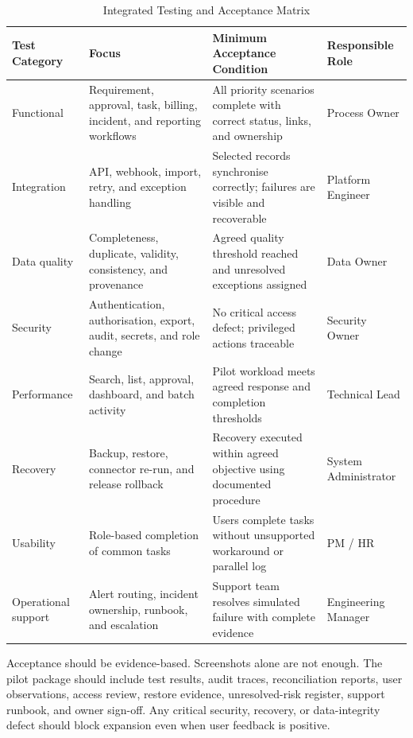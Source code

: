 \documentclass[12pt,a4paper]{report}
\begin{document}
\begin{table}[H]
\centering
\caption{Integrated Testing and Acceptance Matrix}
\label{tab:acceptance-matrix}
\scriptsize
\renewcommand{\arraystretch}{1.14}
\begin{tabularx}{\textwidth}{>{\raggedright\arraybackslash}p{2.3cm}
                                >{\raggedright\arraybackslash}p{3.3cm}
                                >{\raggedright\arraybackslash}X
                                >{\raggedright\arraybackslash}p{2.7cm}}
\toprule
\textbf{Test Category} & \textbf{Focus} & \textbf{Minimum Acceptance Condition} & \textbf{Responsible Role} \\
\midrule
Functional & Requirement, approval, task, billing, incident, and reporting workflows & All priority scenarios complete with correct status, links, and ownership & Process Owner \\
Integration & API, webhook, import, retry, and exception handling & Selected records synchronise correctly; failures are visible and recoverable & Platform Engineer \\
Data quality & Completeness, duplicate, validity, consistency, and provenance & Agreed quality threshold reached and unresolved exceptions assigned & Data Owner \\
Security & Authentication, authorisation, export, audit, secrets, and role change & No critical access defect; privileged actions traceable & Security Owner \\
Performance & Search, list, approval, dashboard, and batch activity & Pilot workload meets agreed response and completion thresholds & Technical Lead \\
Recovery & Backup, restore, connector re-run, and release rollback & Recovery executed within agreed objective using documented procedure & System Administrator \\
Usability & Role-based completion of common tasks & Users complete tasks without unsupported workaround or parallel log & PM / HR \\
Operational support & Alert routing, incident ownership, runbook, and escalation & Support team resolves simulated failure with complete evidence & Engineering Manager \\
\bottomrule
\end{tabularx}
\end{table}

Acceptance should be evidence-based. Screenshots alone are not enough. The pilot package should
include test results, audit traces, reconciliation reports, user observations, access review, restore
evidence, unresolved-risk register, support runbook, and owner sign-off. Any critical security,
recovery, or data-integrity defect should block expansion even when user feedback is positive.
\end{document}
